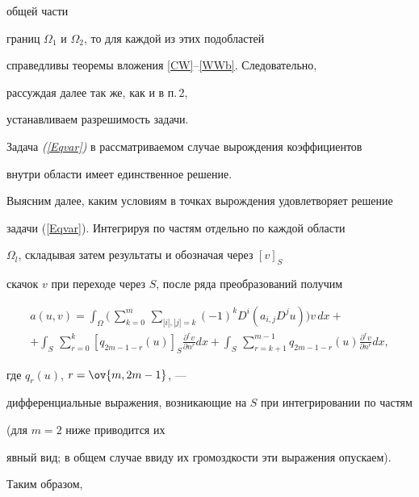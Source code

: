 общей части


границ $\Omega_1$ и $\Omega_2$, то для каждой из этих подобластей 


справедливы теоремы вложения \ref{CW}--\ref{WWb}. Следовательно, 


рассуждая далее так же, как и в п.\,2,


устанавливаем разрешимость задачи.





\begin{thm}


Задача {\em (\ref{Eqvar})} в рассматриваемом случае вырождения коэффициентов 


внутри области имеет единственное решение.


\end{thm}





Выясним далее, каким условиям в точках вырождения удовлетворяет решение


задачи (\ref{Eqvar}). Интегрируя по частям отдельно по каждой области


$\Omega_l$, складывая затем результаты и обозначая через $[ {v} ]_S$ 


скачок $v$ при переходе через $S$, после ряда преобразований получим 


\begin{multline*}


a(u,v)=\int_{\Omega} {\bigg(\,\sum_{k=0}^m\, {\sum_{|i|,|j|=k}


{(-1)^kD^i(a_{i,j}D^ju)\bigg)}} v\, dx} + \\


+\int_S\, {\sum_{r=0}^k {{[q_{2m-1-r}(u)]}_S


\frac{\partial ^rv}{\partial n^r}dx}} + 


\int_S\, {\sum_{r=k+1}^{m-1} {q_{2m-1-r}(u)


\frac{\partial ^rv}{\partial n^r}dx}},


\end{multline*}


где $q_r(u)$, $r=\ov{m,2m-1}$, --- 


дифференциальные выражения, возникающие на $S$ при интегрировании по частям


(для $m=2$ ниже приводится их 


явный вид; в общем случае ввиду их громоздкости эти выражения опускаем). 


Таким образом, 


